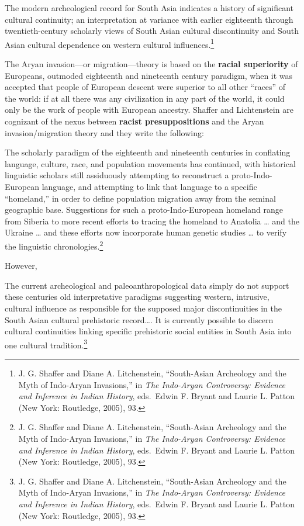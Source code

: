 The modern archeological record for South Asia indicates a history of significant cultural continuity; an interpretation at variance with earlier eighteenth through twentieth-century scholarly views of South Asian cultural discontinuity and South Asian cultural dependence on western cultural influences.\footnote{J. G. Shaffer and Diane A. Litchenstein, “South-Asian Archeology and 	the Myth of Indo-Aryan Invasions,” in \textit{The 	Indo-Aryan Controversy: Evidence and Inference in Indian History}, eds.\ Edwin F. Bryant and Laurie L. Patton (New York: Routledge, 2005), 	93.}

The Aryan invasion—or migration—theory is based on the \textbf{racial superiority} of Europeans, outmoded eighteenth and nineteenth century paradigm, when it was accepted that people of European descent were superior to all other “races” of the world: if at all there was any civilization in any part of the world, it could only be the work of people with European ancestry. Shaffer and Lichtenstein are cognizant of the nexus between \textbf{racist presuppositions} and the Aryan invasion/migration theory and they write the following: 

The scholarly paradigm of the eighteenth and nineteenth centuries in conflating language, culture, race, and population movements has continued, with historical linguistic scholars still assiduously attempting to reconstruct a proto-Indo-European language, and attempting to link that language to a specific “homeland,” in order to define population migration away from the seminal geographic base. Suggestions for such a proto-Indo-European homeland range from Siberia to more recent efforts to tracing the homeland to Anatolia … and the Ukraine … and these efforts now incorporate human genetic studies … to verify the linguistic chronologies.\footnote{J. G. Shaffer and Diane A. Litchenstein, “South-Asian Archeology and 	the Myth of Indo-Aryan Invasions,” in \textit{The Indo-Aryan Controversy: Evidence and Inference in Indian History}, eds.\ Edwin F. Bryant and Laurie L. Patton (New York: Routledge, 2005), 93.}

However,

The current archeological and paleoanthropological data simply do not support these centuries old interpretative paradigms suggesting western, intrusive, cultural influence as responsible for the supposed major discontinuities in the South Asian cultural prehistoric record…. It is currently possible to discern cultural continuities linking specific prehistoric social entities in South Asia into one cultural tradition.\footnote{J. G. Shaffer and Diane A. Litchenstein, “South-Asian Archeology and the Myth of Indo-Aryan Invasions,” in \textit{The Indo-Aryan Controversy: Evidence and Inference in Indian History}, eds.\ Edwin F. Bryant and Laurie L. Patton (New York: Routledge, 2005), 93.}

